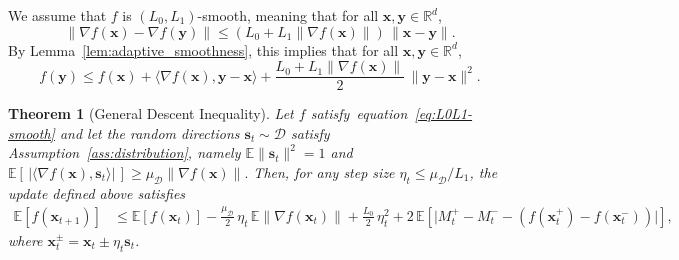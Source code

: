 \documentclass[twoside]{article}
\theoremstyle{plain}
\newtheorem{theorem}[lemma]{Theorem}
\theoremstyle{definition}
\theoremstyle{remark}
\def\eqref#1{equation~\ref{#1}}
\def\cD{{\mathcal{D}}}
\def\vs{{\bm{s}}}
\def\vx{{\bm{x}}}
\def\vy{{\bm{y}}}
\newcommand{\E}{\mathbb{E}}
\newcommand{\R}{\mathbb{R}}
\begin{document}
We assume that $f$ is $(L_0,L_1)$-smooth, meaning that for all
$\vx,\vy\in\R^d$,
\begin{equation}
\label{eq:L0L1-smooth}
    \|\nabla f(\vx) - \nabla f(\vy)\|
    \le (L_0 + L_1 \|\nabla f(\vx)\|)\,\|\vx-\vy\|.
\end{equation}
By Lemma~\ref{lem:adaptive_smoothness}, this implies that for all
$\vx,\vy\in\R^d$,
\begin{equation}
\label{eq:smooth-upper-bound}
    f(\vy)
    \le
    f(\vx)
    + \langle \nabla f(\vx), \vy - \vx\rangle
    + \frac{L_0 + L_1 \|\nabla f(\vx)\|}{2}\,\|\vy-\vx\|^2.
\end{equation}
\begin{propbox}
\begin{theorem}[General Descent Inequality]
\label{thm:general-descent}
Let $f$ satisfy~\eqref{eq:L0L1-smooth} and let the random directions
$\vs_t\sim\cD$ satisfy Assumption~\ref{ass:distribution}, namely
\(
    \E\|\vs_t\|^2 = 1
\)
and
\(
    \E[\,|\langle\nabla f(\vx),\vs_t\rangle|\,] \ge \mu_{\cD}\|\nabla f(\vx)\|.
\)
Then, for any step size $\eta_t \le \mu_{\cD}/L_1$,
the update defined above satisfies
\begin{align}
\E[f(\vx_{t+1})]
&\le
\E[f(\vx_t)]
- \tfrac{\mu_{\cD}}{2}\,\eta_t\,\E\|\nabla f(\vx_t)\|
+ \tfrac{L_0}{2}\,\eta_t^2
+ 2\,\E\!\left[
    \big|
        M_t^+ - M_t^- - (f(\vx_t^+) - f(\vx_t^-))
    \big|
\right],
\label{eq:general-descent}
\end{align}
where $\vx_t^\pm = \vx_t \pm \eta_t \vs_t$.
\end{theorem}
\end{propbox}
\end{document}
